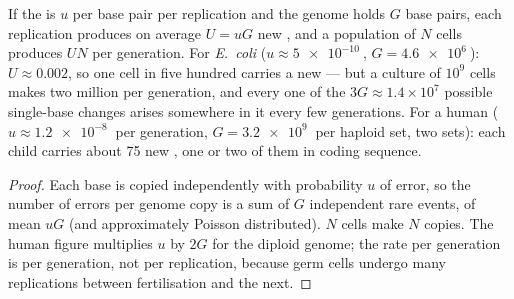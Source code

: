 \begin{theorem}\label{thm:b2:genome-diversification:rate}
If the  is $u$ per base pair per replication and the
genome holds $G$ base pairs, each replication produces on average
$U = uG$ new , and a population of $N$ cells produces $UN$
per generation. For \emph{E.~coli} ($u \approx \qty{5e-10}{}$, $G =
\qty{4.6e6}{}$): $U \approx 0.002$, so one cell in five hundred
carries a new  --- but a culture of $10^{9}$ cells makes two
million per generation, and every one of the $3G \approx 1.4\times
10^{7}$ possible single-base changes arises somewhere in it every
few generations. For a human ($u \approx \qty{1.2e-8}{}$ per
generation, $G = \qty{3.2e9}{}$ per haploid set, two sets): each
child carries about \num{75} new , one or two of them in
coding sequence.
\end{theorem}
\begin{proof}
Each base is copied independently with probability $u$ of error, so
the number of errors per genome copy is a sum of $G$ independent
rare events, of mean $uG$ (and approximately Poisson distributed).
$N$ cells make $N$ copies. The human figure multiplies $u$ by $2G$
for the diploid genome; the rate per generation is per generation,
not per replication, because germ cells undergo many replications
between fertilisation and the next.
\end{proof}

